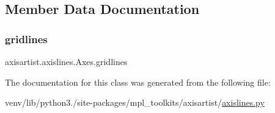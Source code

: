 \subsection{Member Data Documentation}
\mbox{\label{classaxisartist_1_1axislines_1_1Axes_ae7a5b8fe8a5c801fe83db0d3feae434c}} 
\subsubsection{\texorpdfstring{gridlines}{gridlines}}
{\footnotesize\ttfamily axisartist.\+axislines.\+Axes.\+gridlines}



The documentation for this class was generated from the following file\+:\begin{DoxyCompactItemize}
\item 
venv/lib/python3./site-\/packages/mpl\+\_\+toolkits/axisartist/\hyperlink{axisartist_2axislines_8py}{axislines.\+py}\end{DoxyCompactItemize}
